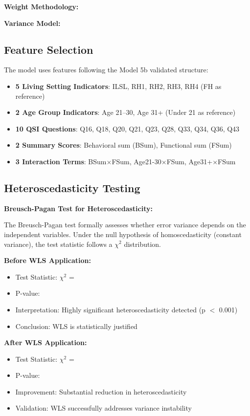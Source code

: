 \textbf{Weight Methodology:} \ModelFourWeightMethod{}

\textbf{Variance Model:} \ModelFourVarianceModel{}

\subsection{Feature Selection}

The model uses \ModelFourNRobustFeatures{} features following the Model 5b validated structure:
\begin{itemize}
    \item \textbf{5 Living Setting Indicators}: ILSL, RH1, RH2, RH3, RH4 (FH as reference)
    \item \textbf{2 Age Group Indicators}: Age 21--30, Age 31+ (Under 21 as reference)
    \item \textbf{10 QSI Questions}: Q16, Q18, Q20, Q21, Q23, Q28, Q33, Q34, Q36, Q43
    \item \textbf{2 Summary Scores}: Behavioral sum (BSum), Functional sum (FSum)
    \item \textbf{3 Interaction Terms}: BSum$\times$FSum, Age21-30$\times$FSum, Age31+$\times$FSum
\end{itemize}

\subsection{Heteroscedasticity Testing}

\textbf{Breusch-Pagan Test for Heteroscedasticity:}

The Breusch-Pagan test formally assesses whether error variance depends on the independent variables. Under the null hypothesis of homoscedasticity (constant variance), the test statistic follows a $\chi^2$ distribution.

\textbf{Before WLS Application:}
\begin{itemize}
    \item Test Statistic: $\chi^2$ = \ModelFourBreuschPagan{}
    \item P-value: \ModelFourBreuschPaganPValue{}
    \item Interpretation: Highly significant heteroscedasticity detected (p $<$ 0.001)
    \item Conclusion: WLS is statistically justified
\end{itemize}

\textbf{After WLS Application:}
\begin{itemize}
    \item Test Statistic: $\chi^2$ = \ModelFourBreuschPaganAfter{}
    \item P-value: \ModelFourBreuschPaganPValueAfter{}
    \item Improvement: Substantial reduction in heteroscedasticity
    \item Validation: WLS successfully addresses variance instability
\end{itemize}

